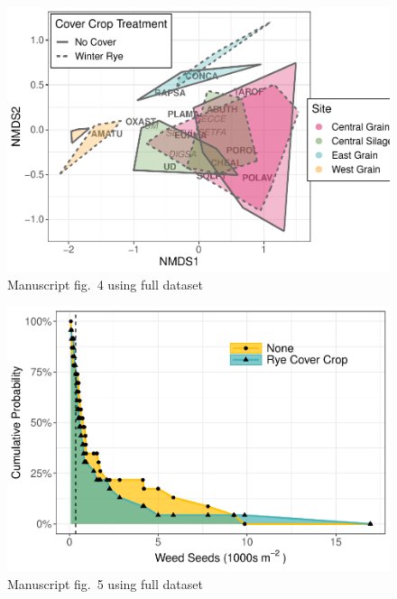 \documentclass[
]{article}
\begin{document}
\begin{figure}
\centering
\includegraphics{supp-mat_files/figure-latex/nmds-1.pdf}
\caption{Manuscript fig.~4 using full dataset}
\end{figure}

\newpage

\begin{figure}
\centering
\includegraphics{supp-mat_files/figure-latex/stochdom-1.pdf}
\caption{Manuscript fig.~5 using full dataset}
\end{figure}
\end{document}
